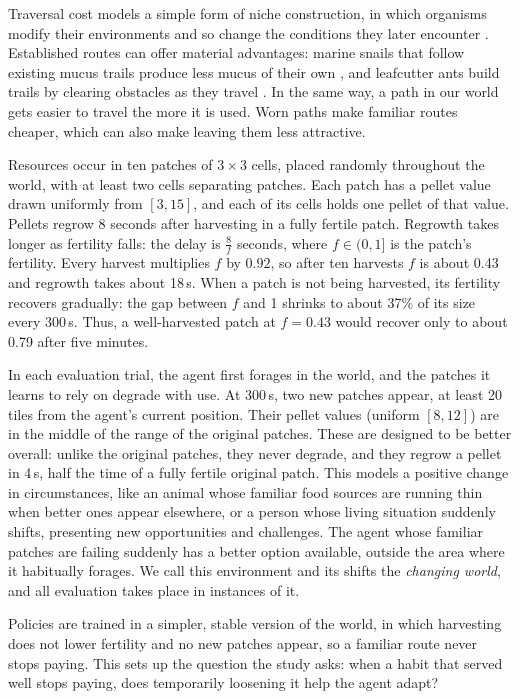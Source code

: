\documentclass[12pt,fleqn]{article}
\begin{document}
Traversal cost models a simple form of niche construction, in which organisms modify their environments and so change the conditions they later encounter \citep{laland_niche_2016}. Established routes can offer material advantages: marine snails that follow existing mucus trails produce less mucus of their own \citep{davies_energy_2007}, and leafcutter ants build trails by clearing obstacles as they travel \citep{bochynek_infrastructure_2019}. In the same way, a path in our world gets easier to travel the more it is used. Worn paths make familiar routes cheaper, which can also make leaving them less attractive.

Resources occur in ten patches of $3\times3$ cells, placed randomly throughout the world, with at least two cells separating patches. Each patch has a pellet value drawn uniformly from $[3,15]$, and each of its cells holds one pellet of that value. Pellets regrow 8 seconds after harvesting in a fully fertile patch. Regrowth takes longer as fertility falls: the delay is $\frac{8}{f}$ seconds, where $f\in(0,1]$ is the patch's fertility. Every harvest multiplies $f$ by $0.92$, so after ten harvests $f$ is about 0.43 and regrowth takes about 18\,s. When a patch is not being harvested, its fertility recovers gradually: the gap between $f$ and 1 shrinks to about 37\% of its size every 300\,s. Thus, a well-harvested patch at $f=0.43$ would recover only to about 0.79 after five minutes.

In each evaluation trial, the agent first forages in the world, and the patches it learns to rely on degrade with use. At 300\,s, two new patches appear, at least 20 tiles from the agent's current position. Their pellet values (uniform $[8,12]$) are in the middle of the range of the original patches. These are designed to be better overall: unlike the original patches, they never degrade, and they regrow a pellet in 4\,s, half the time of a fully fertile original patch. This models a positive change in circumstances, like an animal whose familiar food sources are running thin when better ones appear elsewhere, or a person whose living situation suddenly shifts, presenting new opportunities and challenges. The agent whose familiar patches are failing suddenly has a better option available, outside the area where it habitually forages. We call this environment and its shifts the \emph{changing world}, and all evaluation takes place in instances of it.

Policies are trained in a simpler, stable version of the world, in which harvesting does not lower fertility and no new patches appear, so a familiar route never stops paying. This sets up the question the study asks: when a habit that served well stops paying, does temporarily loosening it help the agent adapt?
\end{document}
